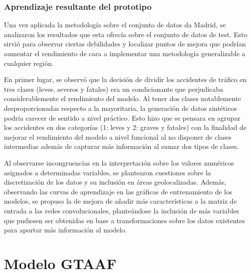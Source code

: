 \subsubsection*{Aprendizaje resultante del prototipo}


Una vez aplicada la metodología sobre el conjunto de datos da Madrid, se analizaron los resultados que esta ofrecía sobre el conjunto de datos de test. Esto sirvió para observar ciertas debilidades y localizar puntos de mejora que podrían aumentar el rendimiento de cara a implementar una metodología generalizable a cualquier región.

En primer lugar, se observó que la decisión de dividir los accidentes de tráfico en tres clases (leves, severos y fatales) era un condicionante que perjudicaba considerablemente el rendimiento del modelo. Al tener dos clases notablemente desproporcionadas respecto a la mayoritaria, la generación de datos sintéticos podría carecer de sentido a nivel práctico. Esto hizo que se pensara en agrupar los accidentes en dos categorías (1: leves y 2: graves y fatales) con la finalidad de mejorar el rendimiento del modelo a nivel funcional al no disponer de clases intermedias además de capturar más información al sumar dos tipos de clases.


Al observarse incongruencias en la interpretación sobre los valores numéricos asignados a determinadas variables, se plantearon cuestiones sobre la discretización de los datos y su inclusión en áreas geolocalizadas. Además, observando las curvas de aprendizaje en las gráficas de entrenamiento de los modelos, se propuso la de mejora de añadir más características a la matriz de entrada a las redes convolucionales, planteándose la inclusión de más variables que pudiesen ser obtenidas en base a transformaciones sobre los datos existentes para aportar más información al modelo.

\section{Modelo GTAAF}
\label{METODOLOGIA_GTAAF}

